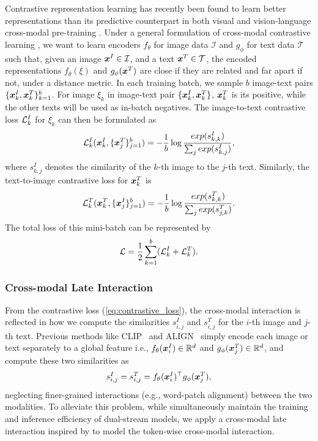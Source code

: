 Contrastive representation learning has recently been found to learn better representations than its predictive counterpart 
in both visual \citep{tian2020contrastive} and vision-language cross-modal pre-training  \citep{radford2021learning}.
Under a general formulation of cross-modal contrastive learning \citep{radford2021learning}, we want to learn encoders $f_\theta$ for image data $\mathcal{I}$ and $g_\phi$ for text data $\mathcal{T}$ such that, given an image $ {\bm{x}}^I \in {\mathcal{I}}$, and a text ${\bm{x}}^T \in {\mathcal{T}}$,  the encoded representations $f_\theta(\xi)$ and $g_\phi({\bm{x}}^T)$ are close if they are related and far apart if not, under a distance metric. 
In each training batch, we sample $b$ image-text pairs $\{{\bm{x}}^I_k, {\bm{x}}^T_k\}_{k=1}^b$.
For image $\xi_k$ in image-text pair $\{{\bm{x}}^I_k, {\bm{x}}^T_k\}$, ${\bm{x}}^T_k$ is its positive, while the other texts 
will be used as in-batch negatives. 
The image-to-text  contrastive loss ${\mathcal{L}}^I_k$ for $\xi_k$  can then be formulated as
\[
{\mathcal{L}}^I_k ({\bm{x}}^I_k, \{{\bm{x}}^T_j\}_{j=1}^b) = -\frac{1}{b} \log \frac{exp(s_{k,k}^I)}{\sum_{j} exp(s_{k,j}^I)},
\]
where $s_{k,j}^I$ denotes the similarity of the $k$-th image to the $j$-th text.
Similarly, the text-to-image contrastive loss for ${\bm{x}}^T_k$ is
\[
{\mathcal{L}}^T_k ({\bm{x}}^T_k, \{{\bm{x}}^I_j\}_{j=1}^b) = -\frac{1}{b} \log \frac{exp(s_{k,k}^T)}{\sum_{j} exp(s_{j,k}^T)}.
\]
The total loss of this mini-batch can be represented by 
\begin{equation}
{\mathcal{L}} = \frac{1}{2}\sum\limits_{k=1}^b ({\mathcal{L}}^I_k + {\mathcal{L}}^T_k). \label{eq:contrastive_loss}
\end{equation}

\vspace{-1mm}
\subsubsection{Cross-modal Late Interaction}
\label{sec:Cross-modal-late}
From the contrastive loss (\ref{eq:contrastive_loss}), the cross-modal interaction is  reflected in how we compute the similarities $s_{i,j}^I$ and $s_{i,j}^T$ for the $i$-th image and $j$-th  text.
Previous methods like CLIP~\citep{radford2021learning} and ALIGN~\citep{jia2021scaling} simply encode each image or text separately to a global feature i.e., $f_\theta({\bm{x}}^I_i) \in \mathbb{R}^{d}$ and $g_\phi({\bm{x}}^T_j) \in \mathbb{R}^{d}$, and compute these two similarities as
\begin{equation}
   s^I_{i,j}  =   s^T_{i,j} =  f_\theta({\bm{x}}^I_i)^\top g_\phi({\bm{x}}^T_j), \label{eq:orig_loss}
\end{equation}
neglecting finer-grained interactions (e.g., word-patch alignment) between the two modalities.
To alleviate this problem, while simultaneously maintain the training and inference efficiency of dual-stream models, we apply a cross-modal late interaction inspired by \cite{khattab2020colbert} to model the token-wise cross-modal interaction.

